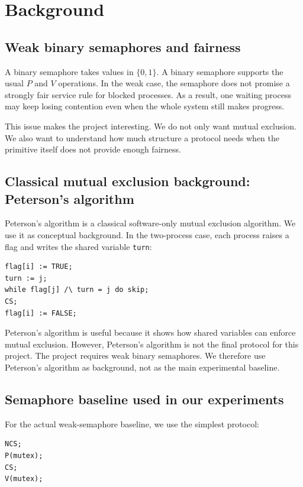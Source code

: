 \documentclass[11pt]{article}
\begin{document}
\section{Background}

\subsection{Weak binary semaphores and fairness}

A binary semaphore takes values in $\{0,1\}$. A binary semaphore supports the usual $P$ and $V$ operations. In the weak case, the semaphore does not promise a strongly fair service rule for blocked processes. As a result, one waiting process may keep losing contention even when the whole system still makes progress.

This issue makes the project interesting. We do not only want mutual exclusion. We also want to understand how much structure a protocol needs when the primitive itself does not provide enough fairness.

\subsection{Classical mutual exclusion background: Peterson's algorithm}

Peterson's algorithm is a classical software-only mutual exclusion algorithm. We use it as conceptual background. In the two-process case, each process raises a flag and writes the shared variable \texttt{turn}:

\begin{lstlisting}
flag[i] := TRUE;
turn := j;
while flag[j] /\ turn = j do skip;
CS;
flag[i] := FALSE;
\end{lstlisting}

Peterson's algorithm is useful because it shows how shared variables can enforce mutual exclusion. However, Peterson's algorithm is not the final protocol for this project. The project requires weak binary semaphores. We therefore use Peterson's algorithm as background, not as the main experimental baseline.

\subsection{Semaphore baseline used in our experiments}

For the actual weak-semaphore baseline, we use the simplest protocol:

\begin{lstlisting}
NCS;
P(mutex);
CS;
V(mutex);
\end{lstlisting}
\end{document}

